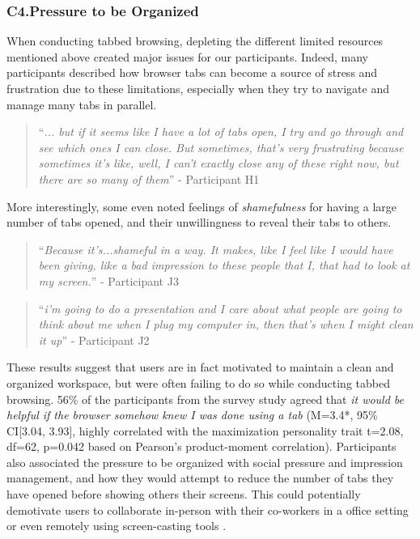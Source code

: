 \subsubsection{C4.Pressure to be Organized}

When conducting tabbed browsing, depleting the different limited resources mentioned above created major issues for our participants. Indeed, many participants described how browser tabs can become a source of stress and frustration due to these limitations, especially when they try to navigate and manage many tabs in parallel.

\begin{quote}
``\emph{... but if it seems like I have a lot of tabs open, I try and go through and see which ones I can close. But sometimes, that's very frustrating because sometimes it's like, well, I can't exactly close any of these right now, but there are so many of them}'' - Participant H1
\end{quote}

More interestingly, some even noted feelings of \emph{shamefulness} for having a large number of tabs opened, and their unwillingness to reveal their tabs to others.

\begin{quote}
``\emph{Because it's...shameful in a way. It makes, like I feel like I would have been giving, like a bad impression to these people that I, that had to look at my screen.}'' - Participant J3

\end{quote}
\begin{quote}
``\emph{i'm going to do a presentation and I care about what people are going to think about me when I plug my computer in, then that's when I might clean it up}'' - Participant J2
\end{quote}

These results suggest that users are in fact motivated to maintain a clean and organized workspace, but were often failing to do so while conducting tabbed browsing. 56\% of the participants from the survey study agreed that \emph{it would be helpful if the browser somehow knew I was done using a tab} (M=3.4*, 95\% CI[3.04, 3.93], highly correlated with the maximization personality trait t=2.08, df=62, p=0.042 based on Pearson's product-moment correlation). Participants also associated the pressure to be organized with social pressure and impression management, and how they would attempt to reduce the number of tabs they have opened before showing others their screens. This could potentially demotivate users to collaborate in-person with their co-workers in a office setting or even remotely using screen-casting tools \cite{birnholtz2012distance}.


